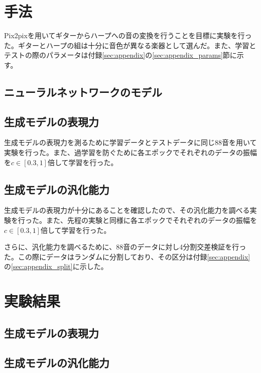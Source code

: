 \section{手法}
Pix2pixを用いてギターからハープへの音の変換を行うことを目標に実験を行った。ギターとハープの組は十分に音色が異なる楽器として選んだ。また、学習とテストの際のパラメータは付録\ref{sec:appendix}の\ref{sec:appendix_params}節に示す。


\subsection{ニューラルネットワークのモデル}



\subsection{生成モデルの表現力}

生成モデルの表現力を測るために学習データとテストデータに同じ88音を用いて実験を行った。また、過学習を防ぐために各エポックでそれぞれのデータの振幅を$c \in [0.3,1]$倍して学習を行った。

\subsection{生成モデルの汎化能力}

生成モデルの表現力が十分にあることを確認したので、その汎化能力を調べる実験を行った。また、先程の実験と同様に各エポックでそれぞれのデータの振幅を$c \in [0.3,1]$倍して学習を行った。

さらに、汎化能力を調べるために、88音のデータに対し4分割交差検証を行った。この際にデータはランダムに分割しており、その区分は付録\ref{sec:appendix}の\ref{sec:appendix_split}に示した。


\section{実験結果}

\subsection{生成モデルの表現力}


\subsection{生成モデルの汎化能力}



